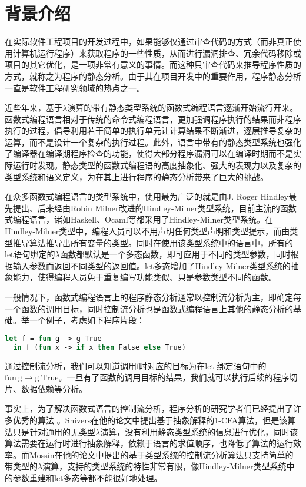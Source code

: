 \documentclass[UTF8, colorlinks]{pkuthss}
\begin{document}
	\chapter{背景介绍}
	在实际软件工程项目的开发过程中，如果能够仅通过审查代码的方式（而非真正使用计算机运行程序）来获取程序的一些性质，从而进行漏洞排查、冗余代码移除或项目的其它优化，是一项非常有意义的事情。而这种只审查代码来推导程序性质的方式，就称之为程序的静态分析。由于其在项目开发中的重要作用，程序静态分析一直是软件工程研究领域的热点之一。
	
	近些年来，基于$\lambda$演算的带有静态类型系统的函数式编程语言逐渐开始流行开来。函数式编程语言相对于传统的命令式编程语言，更加强调程序执行的结果而非程序执行的过程，倡导利用若干简单的执行单元让计算结果不断渐进，逐层推导复杂的运算，而不是设计一个复杂的执行过程。此外，语言中带有的静态类型系统也强化了编译器在编译期程序检查的功能，使得大部分程序漏洞可以在编译时期而不是实际运行时发现。静态类型的函数式编程语的高度抽象化、强大的表现力以及复杂的类型系统和语义定义，为在其上进行程序的静态分析带来了巨大的挑战。
	
	在众多函数式编程语言的类型系统中，使用最为广泛的就是由J. Roger Hindley最先提出\cite{Hindley}、后来经由Robin Milner改进\cite{Milner}的Hindley-Milner类型系统，目前主流的函数式编程语言，诸如Haskell、Ocaml等都采用了Hindley-Milner类型系统。在Hindley-Milner类型中，编程人员可以不用声明任何类型声明和类型提示，而由类型推导算法推导出所有变量的类型。同时在使用该类型系统中的语言中，所有的let语句绑定的$\lambda$函数都默认是一个多态函数，即可应用于不同的类型参数，同时根据输入参数而返回不同类型的返回值。let多态增加了Hindley-Milner类型系统的抽象能力，使得编程人员免于重复编写功能类似、只是参数类型不同的函数。
	
	一般情况下，函数式编程语言上的程序静态分析通常以控制流分析为主，即确定每一个函数的调用目标，同时控制流分析也是函数式编程语言上其他的静态分析的基础。举一个例子，考虑如下程序片段：
	\begin{lstlisting}[language=Ocaml]
  let f = fun g -> g True
  in f (fun x -> if x then False else True)
	\end{lstlisting}
	通过控制流分析，我们可以知道调用f时对应的目标为在let 绑定语句中的$\mathrm{fun}\ \mathrm{g} \to \mathrm{g}\ \mathrm{True}$。一旦有了函数的调用目标的结果，我们就可以执行后续的程序切片、数据依赖等分析。
	
	事实上，为了解决函数式语言的控制流分析，程序分析的研究学者们已经提出了许多优秀的算法	。Shivers在他的论文中提出基于抽象解释的1-CFA算法\cite{Shivers}，但是该算法只是针对通用的无类型$\lambda$演算，没有利用静态类型系统的信息进行优化，同时该算法需要在运行时进行抽象解释，依赖于语言的求值顺序，也降低了算法的运行效率。而Mossin在他的论文中提出的基于类型系统的控制流分析算法只支持简单的带类型的$\lambda$演算，支持的类型系统的特性非常有限，像Hindley-Milner类型系统中的参数重建和let多态等都不能很好地处理。
\end{document}
